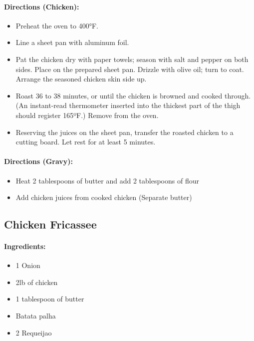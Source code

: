 \documentclass{article}
\begin{document}
\paragraph{Directions (Chicken):}
\begin{itemize}
    \item Preheat the oven to 400°F.
    \item Line a sheet pan with aluminum foil.
    \item Pat the chicken dry with paper towels; season with salt and pepper on both sides. Place on the prepared sheet pan. Drizzle with olive oil; turn to coat. Arrange the seasoned chicken skin side up.
    \item Roast 36 to 38 minutes, or until the chicken is browned and cooked through. (An instant-read thermometer inserted into the thickest part of the thigh should register 165ºF.) Remove from the oven.
    \item Reserving the juices on the sheet pan, transfer the roasted chicken to a cutting board. Let rest for at least 5 minutes.
\end{itemize}  

\paragraph{Directions (Gravy):}
\begin{itemize}
    \item Heat 2 tablespoons of butter and add 2 tablespoons of flour
    \item Add chicken juices from cooked chicken (Separate butter)
\end{itemize} 

\subsection{Chicken Fricassee}

\paragraph{Ingredients:}
\begin{itemize}
    \item 1 Onion
    \item 2lb of chicken
    \item 1 tablespoon of butter
    \item Batata palha
    \item 2 Requeijao
\end{itemize}
\end{document}
